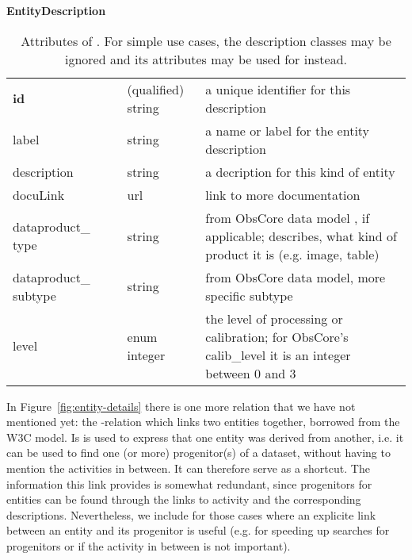 \begin{table}[h]
\small
{}\textwidth
\textbf{\normalsize EntityDescription}\vspace{0.25em}\\
\begin{tabulary}{\textwidth}{@{}p{2.75cm}p{0cm}p{2cm}L@{}}
\toprule
{} & \head{} &  & \\
\midrule
\textbf{id} & & (qualified) string & a unique identifier for this description\\
label       & & string & a name or label for the entity description\\
description & & string & a decription for this kind of entity\\
docuLink    & & url & link to more documentation\\
dataproduct\_ type  & & string       & from ObsCore data model \citep{std:ObsCore}, if applicable; describes, what kind of product it is (e.g. image, table)\\
dataproduct\_ subtype & & string       & from ObsCore data model, more specific subtype\\
level       & & enum integer & the level of processing or calibration; for ObsCore's calib\_level it is an integer between 0 and 3\\
\bottomrule
\end{tabulary}
\caption{Attributes of . For simple use cases, 
the description classes may be ignored and its attributes may be used for 
 instead. 
}\label{tab:entitydescription-attributes}
\end{table}


In Figure~\ref{fig:entity-details} there is one more relation that we have not mentioned yet: 
the -relation which links two entities together, borrowed from the W3C model. 
Is is used to express that 
one entity was derived from another, i.e. it can be used to find one (or more) progenitor(s) 
of a dataset, without having to mention the activities in between. It can therefore serve as 
a shortcut. The information this link provides is somewhat redundant, since progenitors for entities
can be found through the links to activity and the corresponding descriptions.
Nevertheless, we include  for those cases where an explicite 
link between an entity and its progenitor is useful (e.g. for speeding up searches for 
progenitors or if the activity in between is not important).



